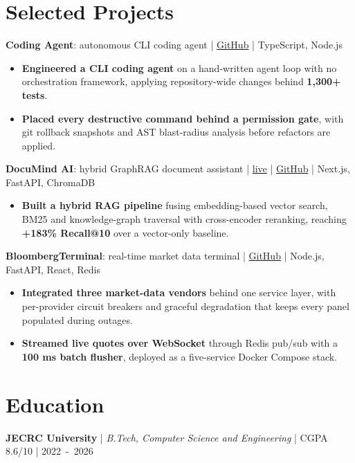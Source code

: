\documentclass[10pt,letterpaper]{article}
\newcommand{\entrygap}{\vspace{1pt}}
\begin{document}
\section*{Selected Projects}

\textbf{Coding Agent}: autonomous CLI coding agent | \href{https://github.com/Dakshjain1604/Ai-coding-Agent}{GitHub} | TypeScript, Node.js
\begin{itemize}
  \item \textbf{Engineered a CLI coding agent} on a hand-written agent loop with no orchestration framework, applying repository-wide changes behind \textbf{1,300+ tests}.
  \item \textbf{Placed every destructive command behind a permission gate}, with git rollback snapshots and AST blast-radius analysis before refactors are applied.
\end{itemize}

\entrygap
\textbf{DocuMind AI}: hybrid GraphRAG document assistant | \href{https://docu-mind-ai-nu.vercel.app}{live} | \href{https://github.com/Dakshjain1604/DocuMind-Ai}{GitHub} | Next.js, FastAPI, ChromaDB
\begin{itemize}
  \item \textbf{Built a hybrid RAG pipeline} fusing embedding-based vector search, BM25 and knowledge-graph traversal with cross-encoder reranking, reaching \textbf{+183\% Recall@10} over a vector-only baseline.
\end{itemize}

\entrygap
\textbf{BloombergTerminal}: real-time market data terminal | \href{https://github.com/Dakshjain1604/bloomberg-terminal-clone}{GitHub} | Node.js, FastAPI, React, Redis
\begin{itemize}
  \item \textbf{Integrated three market-data vendors} behind one service layer, with per-provider circuit breakers and graceful degradation that keeps every panel populated during outages.
  \item \textbf{Streamed live quotes over WebSocket} through Redis pub/sub with a \textbf{100 ms batch flusher}, deployed as a five-service Docker Compose stack.
\end{itemize}

\section*{Education}

\textbf{JECRC University} | \textit{B.Tech, Computer Science and Engineering} | CGPA 8.6/10 |
\mbox{2022 - 2026}
\end{document}
